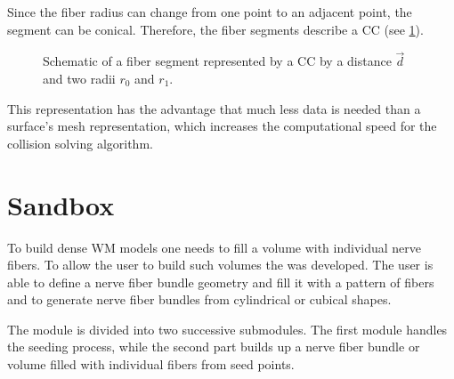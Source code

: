 %
Since the fiber radius can change from one point to an adjacent point, the segment can be conical.
Therefore, the fiber segments describe a \ac{CC} (see \cref{fig:conical}).
\par
%
\begin{figure}[!t]
    \centering
    \setlength{\tikzwidth}{0.5\textwidth}
	\caption{Schematic of a fiber segment represented by a  \ac{CC} by a distance $\vec{d}$ and two radii $r_0$ and $r_1$.}
	\label{fig:conical}
\end{figure}
%
This representation has the advantage that much less data is needed than a surface's mesh representation, which increases the computational speed for the collision solving algorithm.
%
% 
% 
\section{Sandbox}\label{sec:sandbox}
%
To build dense \ac{WM} models one needs to fill a volume with individual nerve fibers.
To allow the user to build such volumes the  was developed.
The user is able to define a nerve fiber bundle geometry and fill it with a pattern of fibers and to generate nerve fiber bundles from cylindrical or cubical shapes.
\par
%
The  module is divided into two successive submodules.
The first module handles the seeding process, while the second part builds up a nerve fiber bundle or volume filled with individual fibers from seed points.
%
% 
% 
